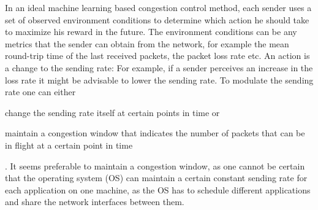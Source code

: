 \documentclass[sigconf]{acmart}
\begin{document}
In an ideal machine learning based congestion control method, each sender uses a set of observed environment conditions to determine which action he should take to maximize his reward in the future. The environment conditions can be any metrics that the sender can obtain from the network, for example the mean round-trip time of the last received packets, the packet loss rate etc. An action is a change to the sending rate: For example, if a sender perceives an increase in the loss rate it might be advisable to lower the sending rate. To modulate the sending rate one can  either
\begin{enumerate*}
\item change the sending rate itself at certain points in time or
\item maintain a congestion window that indicates the number of packets that can be in flight at a certain point in time
\end{enumerate*}. It seems preferable to maintain a congestion window, as one cannot be certain that the operating system (OS) can maintain a certain constant sending rate for each application on one machine, as the OS has to schedule different applications and share the network interfaces between them. 
\end{document}
